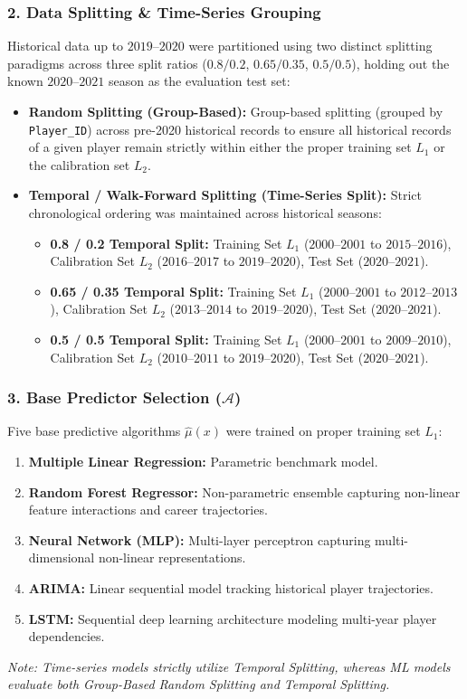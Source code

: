 \documentclass[11pt,a4paper]{article}
\begin{document}
\subsubsection{2. Data Splitting \& Time-Series Grouping}
Historical data up to $2019$--$2020$ were partitioned using two distinct splitting paradigms across three split ratios ($0.8/0.2$, $0.65/0.35$, $0.5/0.5$), holding out the known $2020$--$2021$ season as the evaluation test set:
\begin{itemize}
    \item \textbf{Random Splitting (Group-Based):} Group-based splitting (grouped by \texttt{Player\_ID}) across pre-2020 historical records to ensure all historical records of a given player remain strictly within either the proper training set $L_1$ or the calibration set $L_2$.
    \item \textbf{Temporal / Walk-Forward Splitting (Time-Series Split):} Strict chronological ordering was maintained across historical seasons:
    \begin{itemize}
        \item \textbf{0.8 / 0.2 Temporal Split:} Training Set $L_1$ ($2000$--$2001$ to $2015$--$2016$), Calibration Set $L_2$ ($2016$--$2017$ to $2019$--$2020$), Test Set ($2020$--$2021$).
        \item \textbf{0.65 / 0.35 Temporal Split:} Training Set $L_1$ ($2000$--$2001$ to $2012$--$2013$), Calibration Set $L_2$ ($2013$--$2014$ to $2019$--$2020$), Test Set ($2020$--$2021$).
        \item \textbf{0.5 / 0.5 Temporal Split:} Training Set $L_1$ ($2000$--$2001$ to $2009$--$2010$), Calibration Set $L_2$ ($2010$--$2011$ to $2019$--$2020$), Test Set ($2020$--$2021$).
    \end{itemize}
\end{itemize}

\subsubsection{3. Base Predictor Selection ($\mathcal{A}$)}
Five base predictive algorithms $\hat{\mu}(x)$ were trained on proper training set $L_1$:
\begin{enumerate}
    \item \textbf{Multiple Linear Regression:} Parametric benchmark model.
    \item \textbf{Random Forest Regressor:} Non-parametric ensemble capturing non-linear feature interactions and career trajectories.
    \item \textbf{Neural Network (MLP):} Multi-layer perceptron capturing multi-dimensional non-linear representations.
    \item \textbf{ARIMA:} Linear sequential model tracking historical player trajectories.
    \item \textbf{LSTM:} Sequential deep learning architecture modeling multi-year player dependencies.
\end{enumerate}
\textit{Note: Time-series models strictly utilize Temporal Splitting, whereas ML models evaluate both Group-Based Random Splitting and Temporal Splitting.}
\end{document}

